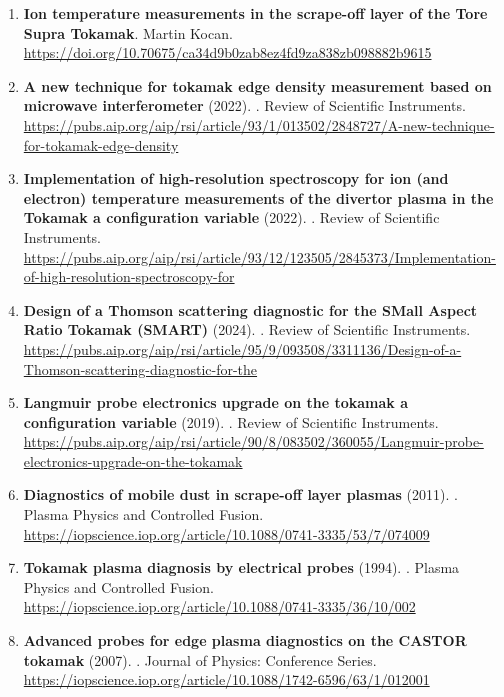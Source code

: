 \documentclass[11pt,a4paper]{article}
\begin{document}
\begin{enumerate}[leftmargin=1.4em]
\item \textbf{Ion temperature measurements in the scrape-off layer of the Tore Supra Tokamak}. Martin Kocan. \url{https://doi.org/10.70675/ca34d9b0zab8ez4fd9za838zb098882b9615}
\item \textbf{A new technique for tokamak edge density measurement based on microwave interferometer} (2022). . Review of Scientific Instruments. \url{https://pubs.aip.org/aip/rsi/article/93/1/013502/2848727/A-new-technique-for-tokamak-edge-density}
\item \textbf{Implementation of high-resolution spectroscopy for ion (and electron) temperature measurements of the divertor plasma in the Tokamak a configuration variable} (2022). . Review of Scientific Instruments. \url{https://pubs.aip.org/aip/rsi/article/93/12/123505/2845373/Implementation-of-high-resolution-spectroscopy-for}
\item \textbf{Design of a Thomson scattering diagnostic for the SMall Aspect Ratio Tokamak (SMART)} (2024). . Review of Scientific Instruments. \url{https://pubs.aip.org/aip/rsi/article/95/9/093508/3311136/Design-of-a-Thomson-scattering-diagnostic-for-the}
\item \textbf{Langmuir probe electronics upgrade on the tokamak a configuration variable} (2019). . Review of Scientific Instruments. \url{https://pubs.aip.org/aip/rsi/article/90/8/083502/360055/Langmuir-probe-electronics-upgrade-on-the-tokamak}
\item \textbf{Diagnostics of mobile dust in scrape-off layer plasmas} (2011). . Plasma Physics and Controlled Fusion. \url{https://iopscience.iop.org/article/10.1088/0741-3335/53/7/074009}
\item \textbf{Tokamak plasma diagnosis by electrical probes} (1994). . Plasma Physics and Controlled Fusion. \url{https://iopscience.iop.org/article/10.1088/0741-3335/36/10/002}
\item \textbf{Advanced probes for edge plasma diagnostics on the CASTOR tokamak} (2007). . Journal of Physics: Conference Series. \url{https://iopscience.iop.org/article/10.1088/1742-6596/63/1/012001}
\end{enumerate}
\end{document}
